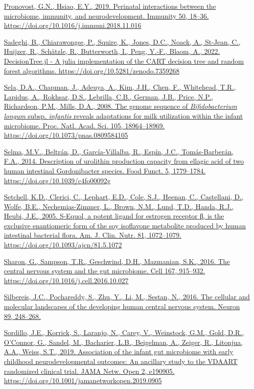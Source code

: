 \documentclass[
]{article}
\begin{document}
\href{https://www.zotero.org/google-docs/?uydJ8e}{Pronovost, G.N.,
Hsiao, E.Y., 2019. Perinatal interactions between the microbiome,
immunity, and neurodevelopment. Immunity 50, 18--36.
https://doi.org/10.1016/j.immuni.2018.11.016}

\href{https://www.zotero.org/google-docs/?uydJ8e}{Sadeghi, B.,
Chiarawongse, P., Squire, K., Jones, D.C., Noack, A., St-Jean, C.,
Huijzer, R., Schätzle, R., Butterworth, I., Peng, Y.-F., Blaom, A.,
2022. DecisionTree.jl - A julia implementation of the CART decision tree
and random forest algorithms. https://doi.org/10.5281/zenodo.7359268}

\href{https://www.zotero.org/google-docs/?uydJ8e}{Sela, D.A., Chapman,
J., Adeuya, A., Kim, J.H., Chen, F., Whitehead, T.R., Lapidus, A.,
Rokhsar, D.S., Lebrilla, C.B., German, J.B., Price, N.P., Richardson,
P.M., Mills, D.A., 2008. The genome sequence of \emph{Bifidobacterium
longum} subsp. \emph{infantis} reveals adaptations for milk utilization
within the infant microbiome. Proc. Natl. Acad. Sci. 105, 18964--18969.
https://doi.org/10.1073/pnas.0809584105}

\href{https://www.zotero.org/google-docs/?uydJ8e}{Selma, M.V., Beltrán,
D., García-Villalba, R., Espín, J.C., Tomás-Barberán, F.A., 2014.
Description of urolithin production capacity from ellagic acid of two
human intestinal Gordonibacter species. Food Funct. 5, 1779--1784.
https://doi.org/10.1039/c4fo00092g}

\href{https://www.zotero.org/google-docs/?uydJ8e}{Setchell, K.D.,
Clerici, C., Lephart, E.D., Cole, S.J., Heenan, C., Castellani, D.,
Wolfe, B.E., Nechemias-Zimmer, L., Brown, N.M., Lund, T.D., Handa, R.J.,
Heubi, J.E., 2005. S-Equol, a potent ligand for estrogen receptor β, is
the exclusive enantiomeric form of the soy isoflavone metabolite
produced by human intestinal bacterial flora. Am. J. Clin. Nutr. 81,
1072--1079. https://doi.org/10.1093/ajcn/81.5.1072}

\href{https://www.zotero.org/google-docs/?uydJ8e}{Sharon, G., Sampson,
T.R., Geschwind, D.H., Mazmanian, S.K., 2016. The central nervous system
and the gut microbiome. Cell 167, 915--932.
https://doi.org/10.1016/j.cell.2016.10.027}

\href{https://www.zotero.org/google-docs/?uydJ8e}{Silbereis, J.C.,
Pochareddy, S., Zhu, Y., Li, M., Sestan, N., 2016. The cellular and
molecular landscapes of the developing human central nervous system.
Neuron 89, 248--268.}

\href{https://www.zotero.org/google-docs/?uydJ8e}{Sordillo, J.E.,
Korrick, S., Laranjo, N., Carey, V., Weinstock, G.M., Gold, D.R.,
O'Connor, G., Sandel, M., Bacharier, L.B., Beigelman, A., Zeiger, R.,
Litonjua, A.A., Weiss, S.T., 2019. Association of the infant gut
microbiome with early childhood neurodevelopmental outcomes: An
ancillary study to the VDAART randomized clinical trial. JAMA Netw. Open
2, e190905. https://doi.org/10.1001/jamanetworkopen.2019.0905}
\end{document}
